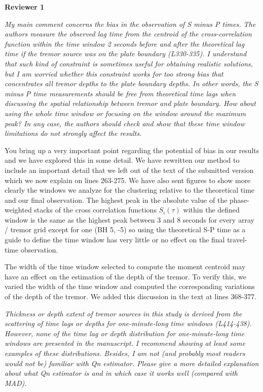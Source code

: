 \documentclass[letterpaper, 12pt]{article}
\begin{document}
\textbf{Reviewer 1}

\bigskip

\textit{My main comment concerns the bias in the observation of S minus P times. The authors measure the observed lag time from the centroid of the cross-correlation function within the time window 2 seconds before and after the theoretical lag time if the tremor source was on the plate boundary (L330-335). I understand that such kind of constraint is sometimes useful for obtaining realistic solutions, but I am worried whether this constraint works for too strong bias that concentrates all tremor depths to the plate boundary depths. In other words, the S minus P time measurements should be free from theoretical time lags when discussing the spatial relationship between tremor and plate boundary. How about using the whole time window or focusing on the window around the maximum peak? In any case, the authors should check and show that these time window limitations do not strongly affect the results.}

\bigskip

You bring up a very important point regarding the potential of bias in our results and we have explored this in some detail.  We have rewritten our method to include an important detail that we left out of the text of the submitted version which we now explain on lines 263-275.  We have also sent figures to show more clearly the windows we analyze for the clustering relative to the theoretical time and our final observation.  The highest peak in the absolute value of the phase-weighted stacks of the cross correlation functions $S_i(\tau)$ within the defined window is the same as the highest peak between 3 and  8 seconds for every array / tremor grid  except for one (BH 5, -5) so using the theoretical S-P time as a guide to define the time window has very little or no effect on the final travel-time observation. 

\smallskip

The width of the time window selected to compute the moment centroid may have an effect on the estimation of the depth of the tremor. To verify this, we varied the width of the time window and computed the corresponding variations of the depth of the tremor. We added this discussion in the text at lines 368-377.

\bigskip

\textit{Thickness or depth extent of tremor sources in this study is derived from the scattering of time lags or depths for one-minute-long time windows (L414-438). However, none of the time lag or depth distribution for one-minute-long time windows are presented in the manuscript. I recommend showing at least some examples of these distributions. Besides, I am not (and probably most readers would not be) familiar with Qn estimator. Please give a more detailed explanation about what Qn estimator is and in which case it works well (compared with MAD).}
\end{document}
